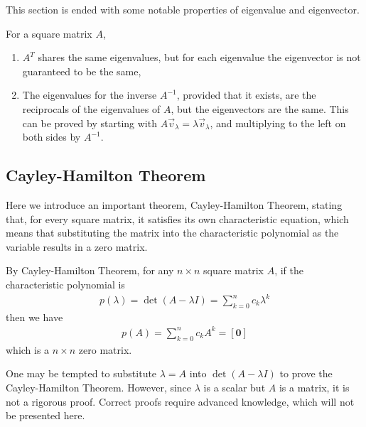 This section is ended with some notable properties of eigenvalue and eigenvector.
\begin{proper}
For a square matrix $A$,
\begin{enumerate}
\item $A^T$ shares the same eigenvalues, but for each eigenvalue the eigenvector is not guaranteed to be the same,
\item The eigenvalues for the inverse $A^{-1}$, provided that it exists, are the reciprocals of the eigenvalues of $A$, but the eigenvectors are the same. This can be proved by starting with $A\vec{v}_\lambda = \lambda\vec{v}_\lambda$, and multiplying to the left on both sides by $A^{-1}$.
\end{enumerate}
\end{proper}

\subsection{Cayley-Hamilton Theorem}
Here we introduce an important theorem, Cayley-Hamilton Theorem, stating that, for every square matrix, it satisfies its own characteristic equation, which means that substituting the matrix into the characteristic polynomial as the variable results in a zero matrix.
\begin{thm}
By Cayley-Hamilton Theorem, for any $n \times n$ square matrix $A$, if the characteristic polynomial is
\begin{align*}
p(\lambda) = \det(A-\lambda I) = \sum_{k=0}^{n} c_k \lambda^k
\end{align*}
then we have
\begin{align*}
p(A) = \sum_{k=0}^{n} c_k A^k = [\textbf{0}]
\end{align*}
which is a $n \times n$ zero matrix.
\end{thm}
One may be tempted to substitute $\lambda = A$ into $\det(A-\lambda I)$ to prove the Cayley-Hamilton Theorem. However, since $\lambda$ is a scalar but $A$ is a matrix, it is not a rigorous proof. Correct proofs require advanced knowledge, which will not be presented here.

